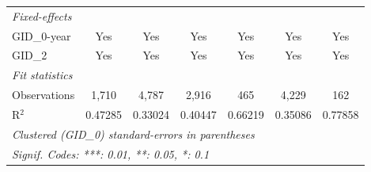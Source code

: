 \begin{table}[htbp]
\begin{tabular}{lcccccc}
      \midrule
      \emph{Fixed-effects}\\
      GID\_0-year        & Yes                    & Yes                          & Yes                     & Yes                            & Yes                     & Yes\\  
      GID\_2             & Yes                    & Yes                          & Yes                     & Yes                            & Yes                     & Yes\\  
      \midrule
      \emph{Fit statistics}\\
      Observations       & 1,710                  & 4,787                        & 2,916                   & 465                            & 4,229                   & 162\\  
      R$^2$              & 0.47285                & 0.33024                      & 0.40447                 & 0.66219                        & 0.35086                 & 0.77858\\  
      \midrule \midrule
      \multicolumn{7}{l}{\emph{Clustered (GID\_0) standard-errors in parentheses}}\\
      \multicolumn{7}{l}{\emph{Signif. Codes: ***: 0.01, **: 0.05, *: 0.1}}\\
   \end{tabular}
\end{table}



